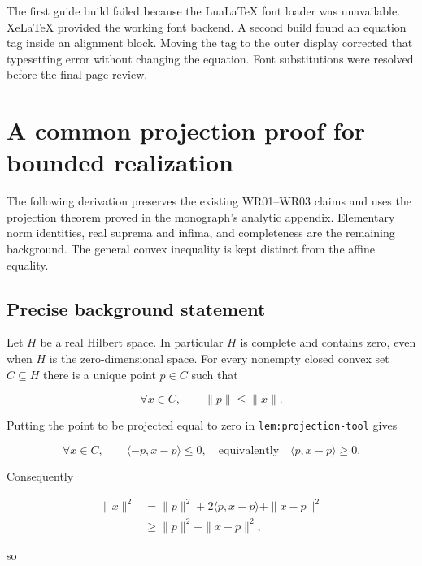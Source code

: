 \documentclass[11pt]{article}
\begin{document}
The first guide build failed because the LuaLaTeX font loader was
unavailable. XeLaTeX provided the working font backend. A second build
found an equation tag inside an alignment block. Moving the tag to the
outer display corrected that typesetting error without changing the
equation. Font substitutions were resolved before the final page review.

\hypertarget{a-common-projection-proof-for-bounded-realization}{%
\section{A common projection proof for bounded
realization}\label{a-common-projection-proof-for-bounded-realization}}

The following derivation preserves the existing WR01--WR03 claims and
uses the projection theorem proved in the monograph's analytic appendix.
Elementary norm identities, real suprema and infima, and completeness
are the remaining background. The general convex inequality is kept
distinct from the affine equality.

\hypertarget{precise-background-statement}{%
\subsection{Precise background
statement}\label{precise-background-statement}}

Let \(H\) be a real Hilbert space. In particular \(H\) is complete and
contains zero, even when \(H\) is the zero-dimensional space. For every
nonempty closed convex set \(C \subseteq H\) there is a unique point
\(p \in C\) such that

\[
\forall x\in C,\qquad \|p\|\le \|x\|.
\]

Putting the point to be projected equal to zero in
\texttt{lem:projection-tool} gives

\[
\forall x\in C,\qquad
\langle -p,x-p\rangle\le0,
\quad\text{equivalently}\quad
\langle p,x-p\rangle\ge0.                 \tag{1}
\]

Consequently

\nopagebreak[4]

\[
\begin{aligned}
\|x\|^2
 &=\|p\|^2+2\langle p,x-p\rangle+\|x-p\|^2\\
 &\ge\|p\|^2+\|x-p\|^2,
\end{aligned}
\]

so

\nopagebreak[4]
\end{document}
